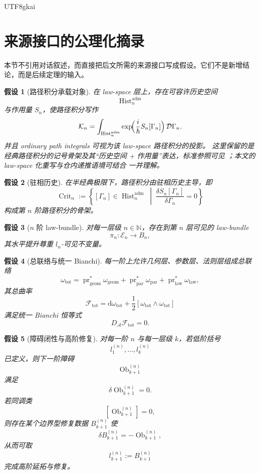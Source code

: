 \documentclass[12pt]{article}
\newtheorem{assumption}{假设}[section]
\newcommand{\dd}{\mathrm{d}}
\newcommand{\Ob}{\operatorname{Ob}}
\newcommand{\NN}{\mathbb{N}}
\newcommand{\Hist}{\operatorname{Hist}}
\newcommand{\Crit}{\operatorname{Crit}}
\newcommand{\pr}{\operatorname{pr}}
\begin{document}
\begin{CJK*}{UTF8}{gkai}
\section{来源接口的公理化摘录}

本节不引用对话叙述，而直接把后文所需的来源接口写成假设。它们不是新增结论，而是后续定理的输入。

\begin{assumption}[路径积分承载对象]\label{ass:path}
在 law-space 层上，存在可容许历史空间
\[
\Hist_n^{\mathrm{adm}}
\]
与作用量 $S_n$，使路径积分写作
\[
\mathcal K_n=
\int_{\Hist_n^{\mathrm{adm}}}
\exp\!\Bigl(\frac{i}{\hbar}S_n[\Gamma_n]\Bigr)\,\mathcal D\Gamma_n.
\]
并且 ordinary path integrals 可视为该 law-space 路径积分的投影。
这里保留的是经典路径积分的记号骨架及其“历史空间 + 作用量”表达，标准参照可见 \cite{FeynmanHibbs1965QMPI,Schulman2005Technique}；本文的 law-space 化重写与仓内递推语境可结合
  \cite{RepoTex36Formal,GaoZhengAppVol3} 一并理解。
\end{assumption}

\begin{assumption}[驻相历史]\label{ass:crit}
在半经典极限下，路径积分由驻相历史主导，即
\[
\Crit_n:=
\left\{[\Gamma_n]\in\Hist_n^{\mathrm{adm}}\;\middle|\;\frac{\delta S_n[\Gamma_n]}{\delta\Gamma_n}=0\right\}
\]
构成第 $n$ 阶路径积分的骨架。
\end{assumption}

\begin{assumption}[$n$ 阶 law-bundle]\label{ass:bundle}
对每一层级 $n\in\NN$，存在到第 $n$ 层可见的 law-bundle
\[
\pi_n:\mathcal E_n\to B_n,
\]
其水平提升尊重 $l_n$-可见不变量。
\end{assumption}

\begin{assumption}[总联络与统一 Bianchi]\label{ass:bianchi}
每一阶上允许几何层、参数层、法则层组成总联络
\[
\omega_{\mathrm{tot}}=\pr_{\mathrm{geom}}^*\omega_{\mathrm{geom}}+\pr_{\mathrm{par}}^*\omega_{\mathrm{par}}
  +\pr_{\mathrm{law}}^*\omega_{\mathrm{law}},
\]
其总曲率
\[
\mathcal F_{\mathrm{tot}}=\dd\omega_{\mathrm{tot}}+\frac12[\omega_{\mathrm{tot}}\wedge\omega_{\mathrm{tot}}]
\]
满足统一 Bianchi 恒等式
\[
D_{\mathcal A}\mathcal F_{\mathrm{tot}}=0.
\]
\end{assumption}

\begin{assumption}[障碍闭性与高阶修复]\label{ass:obstruction}
对每一阶 $n$ 与每一层级 $k$，若低阶括号
\[
l_1^{(n)},\dots,l_k^{(n)}
\]
已定义，则下一阶障碍
\[
\Ob_{k+1}^{(n)}
\]
满足
\[
\delta\Ob_{k+1}^{(n)}=0.
\]
若同调类
\[
[\Ob_{k+1}^{(n)}]=0,
\]
则存在某个边界型修复数据 $B_{k+1}^{(n)}$ 使
\[
\delta B_{k+1}^{(n)}=-\Ob_{k+1}^{(n)},
\]
从而可取
\[
l_{k+1}^{(n)}:=B_{k+1}^{(n)}
\]
完成高阶延拓与修复。
\end{assumption}


\end{CJK*}
\end{document}
